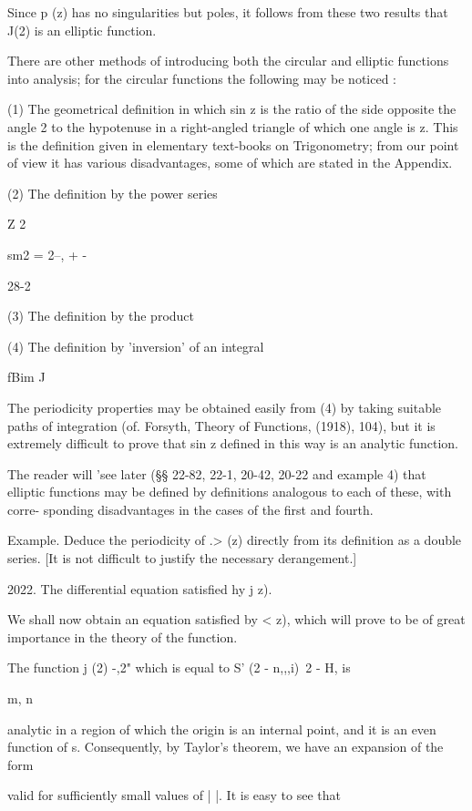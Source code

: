 {Since p (z) has no singularities but poles, it follows from these two
results that J(2) is an elliptic function.

There are other methods of introducing both the circular and elliptic
functions into analysis; for the circular functions the following may
be noticed :

(1) The geometrical definition in which sin z is the ratio of the side
opposite the angle 2 to the hypotenuse in a right-angled triangle of
which one angle is z. This is the definition given in elementary
text-books on Trigonometry; from our point of view it has various
disadvantages, some of which are stated in the Appendix.

(2) The definition by the power series

Z 2

sm2 = 2--, + -

28-2

%
%

(3) The definition by the product

(4) The definition by 'inversion' of an integral

fBim J

The periodicity properties may be obtained easily from (4) by taking
suitable paths of integration (of. Forsyth, Theory of Functions,
(1918), 104), but it is extremely difficult to prove that sin z
defined in this way is an analytic function.

The reader will 'see later (§§ 22-82, 22-1, 20-42, 20-22 and
example 4) that elliptic functions may be defined by definitions
analogous to each of these, with corre- sponding disadvantages in the
cases of the first and fourth.

Example. Deduce the periodicity of .> (z) directly from its definition
as a double series. [It is not difficult to justify the necessary
derangement.]

2022. The differential equation satisfied hy j z).

We shall now obtain an equation satisfied by < z), which will prove to
be of great importance in the theory of the function.

The function j (2) -,2" which is equal to S' (2 - n,,,i)~2 - H, is

m, n

analytic in a region of which the origin is an internal point, and it
is an even function of s. Consequently, by Taylor's theorem, we have
an expansion of the form

valid for sufficiently small values of | |. It is easy to see that

}
